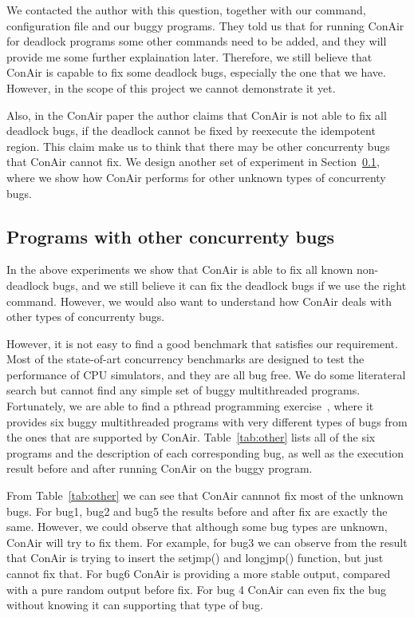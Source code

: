We contacted the author with this question, together with our command,
configuration file and our buggy programs. They told us that for running ConAir
for deadlock programs some other commands need to be added, and they will
  provide me some further explaination later. Therefore, we still believe that
  ConAir is capable to fix some deadlock bugs, especially the one that we have. However, in the scope of this project we cannot demonstrate it yet.

Also, in the ConAir paper the author claims that ConAir is not able to fix all
deadlock bugs, if the deadlock cannot be fixed by reexecute the idempotent
region. This claim make us to think that there may be other concurrenty bugs
that ConAir cannot fix. We design another set of experiment in
Section~\ref{sec:ex-other}, where we show how ConAir performs for other unknown
types of concurrenty bugs.

\subsection{Programs with other concurrenty bugs}
\label{sec:ex-other}

In the above experiments we show that ConAir is able to fix all known
non-deadlock bugs, and we still believe it can fix the deadlock bugs if we use
the right command. However, we would also want to understand how ConAir deals
with other types of concurrenty bugs.

However, it is not easy to find a good benchmark that satisfies our requirement.
Most of the state-of-art concurrency benchmarks are designed to test the
performance of CPU simulators, and they are all bug free. We do some literateral
search but cannot find any simple set of buggy multithreaded programs.
Fortunately, we are able to find a pthread programming
exercise~\cite{pthread-web}, where it provides six buggy multithreaded programs
with very different types of bugs from the ones that are supported by ConAir.
Table~\ref{tab:other} lists all of the six programs and the description of each
corresponding bug, as well as the execution result before and after running
ConAir on the buggy program.

From Table~\ref{tab:other} we can see that ConAir cannnot fix most of the
unknown bugs. For bug1, bug2 and bug5 the results before and after fix are
exactly the same. However, we could observe that although some bug types are
unknown, ConAir will try to fix them. For example, for bug3 we can observe from
the result that ConAir is trying to insert the setjmp() and longjmp() function,
but just cannot fix that. For bug6 ConAir is providing a more stable output,
compared with a pure random output before fix. For bug 4 ConAir can even fix the
bug without knowing it can supporting that type of bug.

